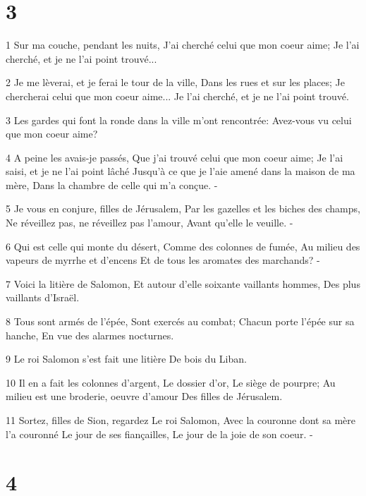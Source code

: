 \chapter{3}

\par 1 Sur ma couche, pendant les nuits, J'ai cherché celui que mon coeur aime; Je l'ai cherché, et je ne l'ai point trouvé...
\par 2 Je me lèverai, et je ferai le tour de la ville, Dans les rues et sur les places; Je chercherai celui que mon coeur aime... Je l'ai cherché, et je ne l'ai point trouvé.
\par 3 Les gardes qui font la ronde dans la ville m'ont rencontrée: Avez-vous vu celui que mon coeur aime?
\par 4 A peine les avais-je passés, Que j'ai trouvé celui que mon coeur aime; Je l'ai saisi, et je ne l'ai point lâché Jusqu'à ce que je l'aie amené dans la maison de ma mère, Dans la chambre de celle qui m'a conçue. -
\par 5 Je vous en conjure, filles de Jérusalem, Par les gazelles et les biches des champs, Ne réveillez pas, ne réveillez pas l'amour, Avant qu'elle le veuille. -
\par 6 Qui est celle qui monte du désert, Comme des colonnes de fumée, Au milieu des vapeurs de myrrhe et d'encens Et de tous les aromates des marchands? -
\par 7 Voici la litière de Salomon, Et autour d'elle soixante vaillants hommes, Des plus vaillants d'Israël.
\par 8 Tous sont armés de l'épée, Sont exercés au combat; Chacun porte l'épée sur sa hanche, En vue des alarmes nocturnes.
\par 9 Le roi Salomon s'est fait une litière De bois du Liban.
\par 10 Il en a fait les colonnes d'argent, Le dossier d'or, Le siège de pourpre; Au milieu est une broderie, oeuvre d'amour Des filles de Jérusalem.
\par 11 Sortez, filles de Sion, regardez Le roi Salomon, Avec la couronne dont sa mère l'a couronné Le jour de ses fiançailles, Le jour de la joie de son coeur. -

\chapter{4}

